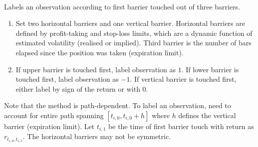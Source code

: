 \begin{method} \\
Labels an observation according to first barrier touched out of three barriers.
\begin{enumerate}[label=\roman*.]
\setlength{\itemsep}{0pt}
\item Set two horizontal barriers and one vertical barrier. Horizontal barriers are defined by profit-taking and stop-loss limits, which are a dynamic function of estimated volatility (realised or implied). Third barrier is the number of bars elapsed since the position was taken (expiration limit).
\item If upper barrier is touched first, label observation as $1$. If lower barrier is touched first, label observation as $-1$. If vertical barrier is touched first, either label by sign of the return or with $0$.
\end{enumerate}
Note that the method is path-dependent. To label an observation, need to account for entire path spanning $[t_{i,0}, t_{i,0} + h]$ where $h$ defines the vertical barrier (expiration limit). Let $t_{i,1}$ be the time of first barrier touch with return as $r_{t_{i,0}, t_{i,1}}$. The horizontal barriers may not be symmetric.
\end{method}

